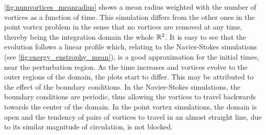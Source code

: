\documentclass[../main.tex]{subfiles}
\begin{document}
\cref{fig:numvortices_meanradius} shows a mean radius weighted with the number of vortices as a function of time. This simulation differs from the other ones in the point vortex problem in the sense that no vortices are removed at any time, thereby being the integration domain the whole $\mathbb{R}^2$. It is easy to see that the evolution follows a linear profile which, relating to the Navier-Stokes simulations (see \cref{fig:energy_enstrophy_mean}), is a good approximation for the initial times, near the perturbation region. As the time increases and vortices evolve to the outer regions of the domain, the plots start to differ. This may be attributed to the effect of the boundary conditions. In the Navier-Stokes simulations, the boundary conditions are periodic, thus allowing the vortices to travel backwards towards the center of the domain. In the point vortex simulations, the domain is open and the tendency of pairs of vortices to travel in an almost straight line, due to its similar magnitude of circulation, is not blocked.
\end{document}

